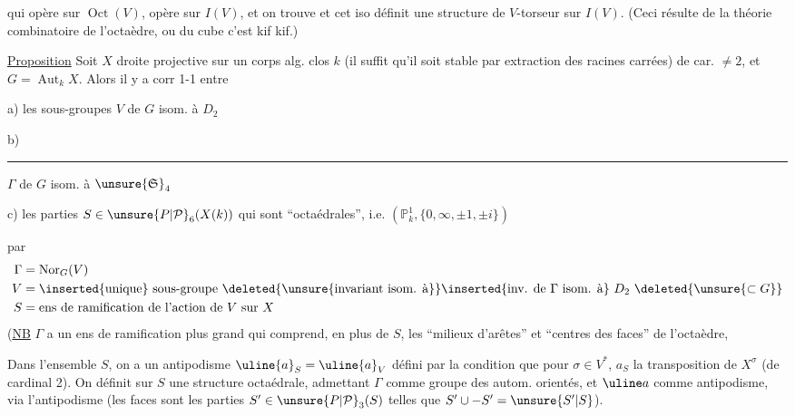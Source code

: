 qui opère sur $\operatorname{Oct}(V)$, opère sur $I(V)$, et on trouve
et cet iso  définit une structure de
$V$-torseur sur $I(V)$. (Ceci résulte de la théorie
combinatoire de l'octaèdre, ou du cube c'est kif kif.)

\uline{Proposition} Soit $X$ droite projective sur un corps alg. clos $k$
(il suffit qu'il  soit stable par extraction des racines
carrées) de car. $\ne2$, et $G=\operatorname{Aut}_kX$. Alors il y a corr 1-1
entre

a) les sous-groupes $V$ de $G$ isom. à $D_2$

b) \rule{3cm}{0.2pt} $\Gamma$ de $G$ isom. à $\unsure{\mathfrak S}_4$ 

c) les parties $S\in\unsure{P|\mathcal P}_6(X(k))$ qui sont ``octaédrales'', i.e.
 $(\mathbb P^1_k,\{0,\infty,\pm1,\pm i\})$

par
\[
\begin{aligned}
\Gamma&=\operatorname{Nor}_G(V)\\
V&=\inserted{\text{unique}}\ \text{sous-groupe }\deleted{\text{\unsure{invariant isom. à}}}\inserted{\text{inv. de }\Gamma\ \text{isom. à}}\ D_2\ \deleted{\unsure{\subset G}}\\
S&=\text{ens de ramification de l'action de }V\text{ sur }X
\end{aligned}
\]
(\uline{NB} $\Gamma$ a un ens de ramification
plus grand qui comprend, en plus de $S$,
les ``milieux d'arêtes'' et ``centres des faces''
de l'octaèdre,


Dans l'ensemble $S$, on a un antipodisme $\uline{a}_S=\uline{a}_V$
défini par la condition que pour $\sigma\in V^*$, $a_S$  la transposition
de $X^\sigma$ (de cardinal 2). On définit sur $S$ une
structure octaédrale, admettant $\Gamma$ comme groupe des
autom. orientés, et $\uline a$ comme antipodisme, via l'antipodisme
(les faces sont les parties $S'\in\unsure{P|\mathcal P}_3(S)$ telles que $S'\cup-S'=\unsure{S'|S}$).
